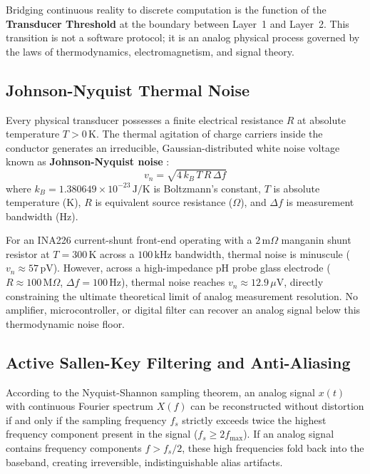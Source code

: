 Bridging continuous reality to discrete computation is the function of the \textbf{Transducer Threshold} at the boundary between Layer~1 and Layer~2. This transition is not a software protocol; it is an analog physical process governed by the laws of thermodynamics, electromagnetism, and signal theory.

\subsection{Johnson-Nyquist Thermal Noise}
Every physical transducer possesses a finite electrical resistance $R$ at absolute temperature $T > 0\,\mathrm{K}$. The thermal agitation of charge carriers inside the conductor generates an irreducible, Gaussian-distributed white noise voltage known as \textbf{Johnson-Nyquist noise} \cite{kinsler2000fundamentals}:
\begin{equation}
v_n = \sqrt{4 \, k_B \, T \, R \, \Delta f}
\label{eq:johnson_nyquist}
\end{equation}
where $k_B = 1.380649 \times 10^{-23}\,\mathrm{J/K}$ is Boltzmann's constant, $T$ is absolute temperature ($\mathrm{K}$), $R$ is equivalent source resistance ($\Omega$), and $\Delta f$ is measurement bandwidth ($\mathrm{Hz}$).

For an INA226 current-shunt front-end operating with a $2\,\mathrm{m}\Omega$ manganin shunt resistor at $T = 300\,\mathrm{K}$ across a $100\,\mathrm{kHz}$ bandwidth, thermal noise is minuscule ($v_n \approx 57\,\mathrm{pV}$). However, across a high-impedance pH probe glass electrode ($R \approx 100\,\mathrm{M}\Omega$, $\Delta f = 100\,\mathrm{Hz}$), thermal noise reaches $v_n \approx 12.9\,\mu\mathrm{V}$, directly constraining the ultimate theoretical limit of analog measurement resolution. No amplifier, microcontroller, or digital filter can recover an analog signal below this thermodynamic noise floor.

\subsection{Active Sallen-Key Filtering and Anti-Aliasing}
According to the Nyquist-Shannon sampling theorem, an analog signal $x(t)$ with continuous Fourier spectrum $X(f)$ can be reconstructed without distortion if and only if the sampling frequency $f_s$ strictly exceeds twice the highest frequency component present in the signal ($f_s \ge 2 f_{\max}$). If an analog signal contains frequency components $f > f_s / 2$, these high frequencies fold back into the baseband, creating irreversible, indistinguishable alias artifacts.

